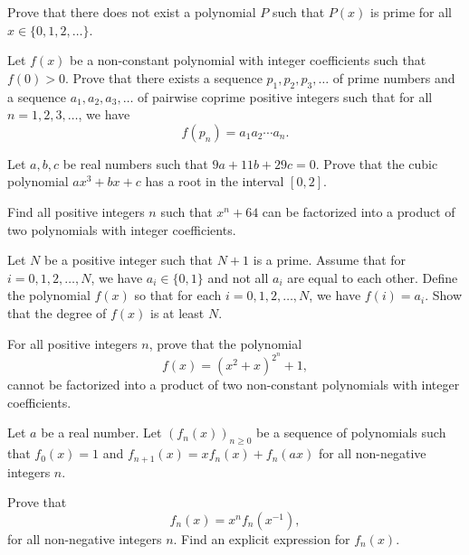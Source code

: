 \documentclass[12pt,a4paper]{memoir}
\theoremstyle{definition}
\begin{document}
\begin{question}
	Prove that there does not exist a polynomial $P$ such that $P(x)$ is prime for all $x\in \{0,1,2,\dots\}$.
\end{question}


\begin{question}
	Let $f(x)$ be a non-constant polynomial with integer coefficients such that $f(0)>0$. Prove that there exists a sequence $p_1,p_2,p_3,\dots$ of prime numbers and a sequence $a_1,a_2,a_3,\dots$ of pairwise coprime positive integers such that for all $n=1,2,3,\dots$, we have \[f(p_n) = a_1a_2\cdots a_n.\]
\end{question}



\begin{question}[name={1994 Iran First Round}]
	Let $a,b,c$ be real numbers such that $9a+11b+29c=0$. Prove that the cubic polynomial $ax^3+bx+c$ has a root in the interval $[0,2]$.
\end{question}


\begin{question}[name={1998 Bulgaria}]
	Find all positive integers $n$ such that $x^n+64$ can be factorized into a product of two polynomials with integer coefficients.
\end{question}



\begin{question}[name={1998 India}]
	Let $N$ be a positive integer such that $N+1$ is a prime. Assume that for $i=0,1,2,\dots,N$, we have $a_i \in \{0,1\}$ and not all $a_i$ are equal to each other. Define the polynomial $f(x)$ so that for each $i=0,1,2,\dots,N$, we have $f(i)=a_i$. Show that the degree of $f(x)$ is at least $N$.
\end{question}



\begin{question}[name={1998 Romania}]
	For all positive integers $n$, prove that the polynomial
	\[f(x)=(x^2+x)^{2^n}+1,\]
	cannot be factorized into a product of two non-constant polynomials with integer coefficients.
\end{question}


\begin{question}[name={1999 China}]
	Let $a$ be a real number. Let $(f_n(x))_{n\ge 0}$ be a sequence of polynomials such that $f_0(x)=1$ and $f_{n+1}(x)=xf_n(x)+f_n(ax)$ for all non-negative integers $n$.
	\begin{tasks}
		\task Prove that \[f_n(x)=x^nf_n\left(x^{-1}\right),\] for all non-negative integers $n$.
		\task Find an explicit expression for $f_n(x)$.
	\end{tasks}
\end{question}
\end{document}
